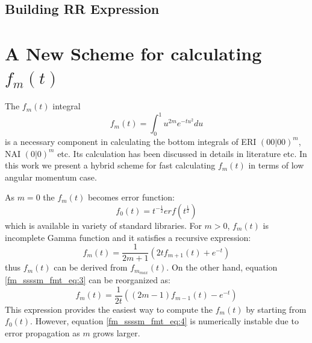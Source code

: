 \subsection{Building RR Expression}


\section{A New Scheme for calculating $f_{m}(t)$}
\label{fmt}

The $f_{m}(t)$ integral
\begin{equation}\label{fm_ssssm_fmt_eq:1}
 f_{m}(t) = \int^{1}_{0} u^{2m} e^{-tu^{2}} du 
\end{equation}
is a necessary component in calculating the bottom integrals of ERI $(00|00)^{m}$,
NAI $(0|0)^{m}$ etc. Its calculation has been discussed in details in literature
\cite{harris1983sssm, gill1991two} etc. In this work we present a hybrid scheme 
for fast calculating $f_{m}(t)$ in terms of low angular momentum case.

As $m=0$ the $f_{m}(t)$ becomes error function:
\begin{equation}
 f_{0}(t) = t^{-\frac{1}{2}} erf(t^{\frac{1}{2}})
\label{fm_ssssm_fmt_eq:2}
\end{equation}
which is available in variety of standard libraries. For $m>0$, $f_{m}(t)$
is incomplete Gamma function and it satisfies a recursive expression:
\begin{equation}
  f_{m}(t) = \frac{1}{2m+1}\left( 2tf_{m+1}(t) + e^{-t}\right)  
 \label{fm_ssssm_fmt_eq:3}
\end{equation}
thus $f_{m}(t)$ can be derived from $f_{m_{max}}(t)$. On the other hand, equation
\ref{fm_ssssm_fmt_eq:3} can be reorganized as:
\begin{equation}
  f_{m}(t) = \frac{1}{2t}\left( (2m-1)f_{m-1}(t) - e^{-t}\right)    
 \label{fm_ssssm_fmt_eq:4}
\end{equation}
This expression provides the easiest way to compute the $f_{m}(t)$ by starting from 
$f_{0}(t)$. However, equation \ref{fm_ssssm_fmt_eq:4} is numerically instable due to
error propagation as $m$ grows larger.

